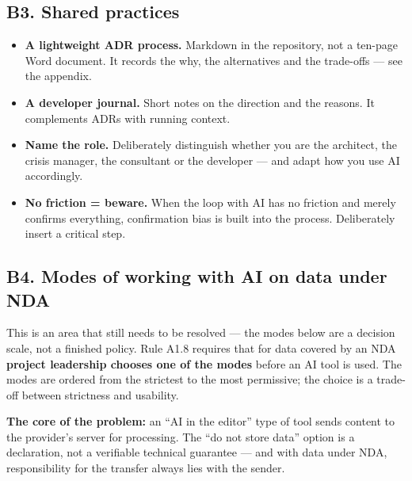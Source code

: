 \subsection{B3. Shared practices}

\begin{itemize}
\item \textbf{A lightweight ADR process.}
Markdown in the repository, not a ten-page Word document.
It records the why, the alternatives and the trade-offs --- see the appendix.
\item \textbf{A developer journal.}
Short notes on the direction and the reasons.
It complements ADRs with running context.
\item \textbf{Name the role.}
Deliberately distinguish whether you are the architect, the crisis manager, the consultant or the developer --- and adapt how you use AI accordingly.
\item \textbf{No friction = beware.}
When the loop with AI has no friction and merely confirms everything, confirmation bias is built into the process.
Deliberately insert a critical step.
\end{itemize}

\subsection{B4. Modes of working with AI on data under NDA}

This is an area that still needs to be resolved --- the modes below are a decision scale, not a finished policy.
Rule A1.8 requires that for data covered by an NDA \textbf{project leadership chooses one of the modes} before an AI tool is used.
The modes are ordered from the strictest to the most permissive; the choice is a trade-off between strictness and usability.

\begin{calloutplain}[grey]
\textbf{The core of the problem:} an \enquote{AI in the editor} type of tool sends content to the provider's server for processing.
The \enquote{do not store data} option is a declaration, not a verifiable technical guarantee --- and with data under NDA, responsibility for the transfer always lies with the sender.
\end{calloutplain}

